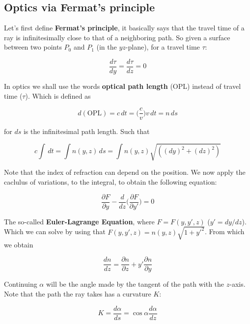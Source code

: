 \documentclass[a4paper]{article}
\begin{document}
\subsection{Optics via Fermat's principle}

Let's first define \textbf{Fermat's principle}, it basically says that the travel time of a ray is infinitesimally close to that of a neighboring path. So given a surface between two points $P_0$ and $P_1$ (in the $yz$-plane), for a travel time $\tau$:

\begin{equation}
    \frac{d\tau}{dy}=\frac{d\tau}{dz}=0
\end{equation}

In optics we shall use the words \textbf{optical path length} (OPL) instead of travel time ($\tau$). Which is defined as

\begin{equation}
    d(\text{OPL})=c\,dt=\bigg(\frac{c}{v}\bigg)v\,dt=n\,ds
\end{equation}

for $ds$ is the infinitesimal path length. Such that

\begin{equation}
     c\int\,dt=\int n(y, z)\,ds=\int n(y, z)\sqrt{((dy)^2+(dz)^2)}
\end{equation}

Note that the index of refraction can depend on the position. We now apply the caclulus of variations, to the integral, to obtain the following equation:

\begin{equation}
    \frac{\partial F}{\partial y}-\frac{d}{dz}\bigg(\frac{\partial F}{\partial y'}\bigg)=0 
\end{equation}

The so-called \textbf{Euler-Lagrange Equation}, where $F=F(y, y', z)$ ($y'=dy/dz$). Which we can solve by using that $F(y, y', z)=n(y,z)\sqrt{1+y'^2}$. From which we obtain

\begin{equation}
    \frac{dn}{dz}=\frac{\partial n}{\partial z}+y'\frac{\partial n}{\partial y}
\end{equation}

Continuing $\alpha$ will be the angle made by the tangent of the path with the $z$-axis. Note that the path the ray takes has a curvature $K$:

\begin{equation}
    K=\frac{d\alpha}{ds}=\cos\alpha\frac{d\alpha}{dz}
\end{equation}
\end{document}
